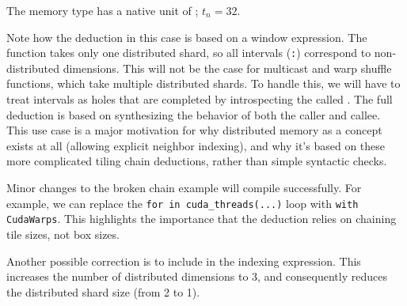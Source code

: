 The  memory type has a native unit of ; $t_n = 32$.



Note how the deduction in this case is based on a window expression.
The  function takes only one distributed shard, so all intervals (\texttt{:}) correspond to non-distributed dimensions.
This will not be the case for multicast and warp shuffle functions, which take multiple distributed shards.
To handle this, we will have to treat intervals as holes that are completed by introspecting the called .
The full deduction is based on synthesizing the behavior of both the caller and callee.
This use case is a major motivation for why distributed memory as a concept exists at all (allowing explicit neighbor indexing), and why it's based on these more complicated tiling chain deductions, rather than simple syntactic checks.

\filbreak
{}



\filbreak
{}

Minor changes to the broken chain example will compile successfully.
For example, we can replace the \texttt{for  in cuda\_threads(...)} loop with \texttt{with CudaWarps}.
This highlights the importance that the deduction relies on chaining tile sizes, not box sizes.



Another possible correction is to include \texttt{} in the indexing expression.
This increases the number of distributed dimensions to 3, and consequently reduces the distributed shard size (from 2 to 1).




